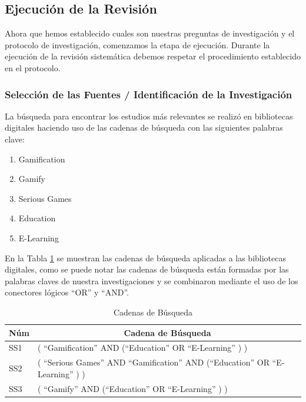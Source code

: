 \documentclass{report}
\begin{document}
        \subsection{Ejecución de la Revisión}
    
        Ahora que hemos establecido cuales son nuestras preguntas de investigación y el protocolo de investigación, comenzamos la etapa de ejecución. Durante la ejecución de la revisión sistemática debemos respetar el procedimiento establecido en el protocolo.
    
            \subsubsection{Selección de las Fuentes / Identificación de la Investigación}
    
            La búsqueda para encontrar los estudios más relevantes se realizó en bibliotecas digitales haciendo uso de las cadenas de búsqueda con las siguientes palabras clave:
            \begin{enumerate}
                \item Gamification
                \item Gamify
                \item Serious Games
                \item Education
                \item E-Learning
            \end{enumerate}       
            En la Tabla \ref{table:SearchString} se muestran las cadenas de búsqueda aplicadas a las bibliotecas digitales, como se puede notar las cadenas de búsqueda están formadas por las palabras claves de nuestra investigaciones y se combinaron mediante el uso de los conectores lógicos ``OR''{ }y ``AND''.    
            \begin{table}
                \begin{center}
                    \caption{Cadenas de Búsqueda}
                    \label{table:SearchString}
                    \begin{tabular}{| p{1.5cm} | p{12.5cm} |}
                        \toprule
                        \hline
                        \multicolumn{1}{|c|}{\textbf{Núm}} & \multicolumn{1}{|c|}{\textbf{Cadena de Búsqueda}} \\
                        \hline
                        SS1 & ( ``Gamification''{ }AND (``Education''{ }OR ``E-Learning''{ }) )\\
                        \hline
                        SS2 & ( ``Serious Games''{ }AND ``Gamification''{ }AND (``Education''{ }OR ``E-Learning''{ }) )\\
                        \hline            
                        SS3 & ( ``Gamify''{ }AND (``Education''{ }OR ``E-Learning''{ }) )\\
                        \hline
                    \end{tabular}
                \end{center}
            \end{table}
            
\end{document}
